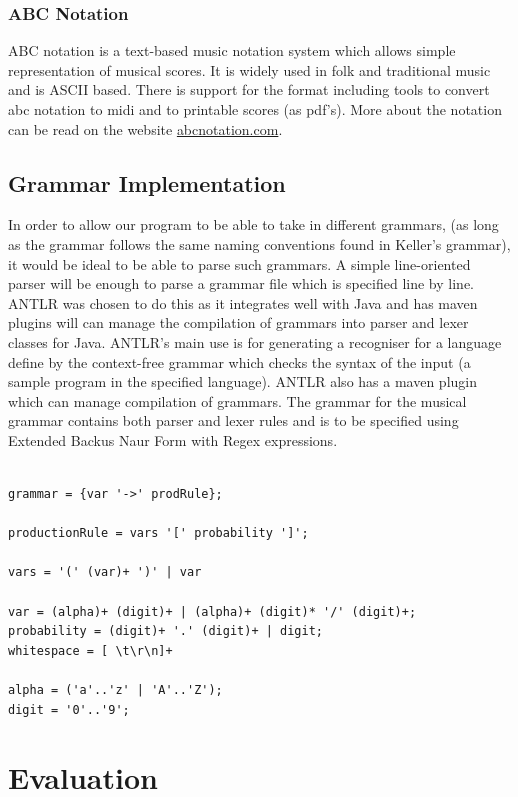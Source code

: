 \documentclass[pdftex,12pt,a4paper]{report}
\begin{document}
\subsection{ABC Notation} \label{abcnotation}
ABC notation is a text-based music notation system which allows simple representation of musical scores. It is widely used in folk and traditional music and is ASCII based. There is support for the format including tools to convert abc notation to midi and to printable scores (as pdf's). More about the notation can be read on the website \url{abcnotation.com}.

\section{Grammar Implementation}
In order to allow our program to be able to take in different grammars, (as long as the grammar follows the same naming conventions found in Keller's grammar), it would be ideal to be able to parse such grammars. A simple line-oriented parser will be enough to parse a grammar file which is specified line by line. ANTLR was chosen to do this as it integrates well with Java and has maven plugins will can manage the compilation of grammars into parser and lexer classes for Java. ANTLR's main use is for generating a recogniser for a language define by the context-free grammar which checks the syntax of the input (a sample program in the specified language). ANTLR also has a maven plugin which can manage compilation of grammars. The grammar for the musical grammar contains both parser and lexer rules and is to be specified using Extended Backus Naur Form with Regex expressions. 

\begin{verbatim}

grammar = {var '->' prodRule};
  
productionRule = vars '[' probability ']';

vars = '(' (var)+ ')' | var

var = (alpha)+ (digit)+ | (alpha)+ (digit)* '/' (digit)+;
probability = (digit)+ '.' (digit)+ | digit;
whitespace = [ \t\r\n]+

alpha = ('a'..'z' | 'A'..'Z');
digit = '0'..'9';

\end{verbatim}




\chapter{Evaluation}
\end{document}
